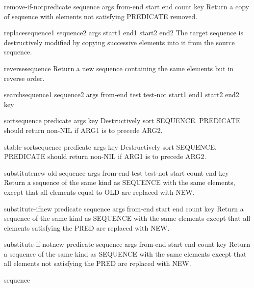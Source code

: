 \begin{function}{remove-if-not}{predicate sequence \rest args \key from-end start end count key}{}{}
  Return a copy of sequence with elements not satisfying PREDICATE removed.
\end{function}

\begin{function}{replace}{sequence1 sequence2 \rest args \key start1 end1 start2 end2}{}{}
  The target sequence is destructively modified by copying successive
   elements into it from the source sequence.
\end{function}

\begin{function}{reverse}{sequence}{}{}
  Return a new sequence containing the same elements but in reverse order.
\end{function}

\begin{function}{search}{sequence1 sequence2 \rest args \key from-end test test-not start1 end1 start2
 end2 key}{}{}
  
\end{function}

\begin{function}{sort}{sequence predicate \rest args \key key}{}{}
  Destructively sort SEQUENCE. PREDICATE should return non-NIL if
   ARG1 is to precede ARG2.
\end{function}

\begin{function}{stable-sort}{sequence predicate \rest args \key key}{}{}
  Destructively sort SEQUENCE. PREDICATE should return non-NIL if
   ARG1 is to precede ARG2.
\end{function}

\begin{function}{substitute}{new old sequence \rest args \key from-end test test-not start count end key}{}{}
  Return a sequence of the same kind as SEQUENCE with the same elements,
  except that all elements equal to OLD are replaced with NEW.
\end{function}

\begin{function}{substitute-if}{new predicate sequence \rest args \key from-end start end count key}{}{}
  Return a sequence of the same kind as SEQUENCE with the same elements
  except that all elements satisfying the PRED are replaced with NEW.
\end{function}

\begin{function}{substitute-if-not}{new predicate sequence \rest args \key from-end start end count key}{}{}
  Return a sequence of the same kind as SEQUENCE with the same elements
  except that all elements not satisfying the PRED are replaced with NEW.
\end{function}

\begin{class}{sequence}{}{}{}
  
\end{class}
